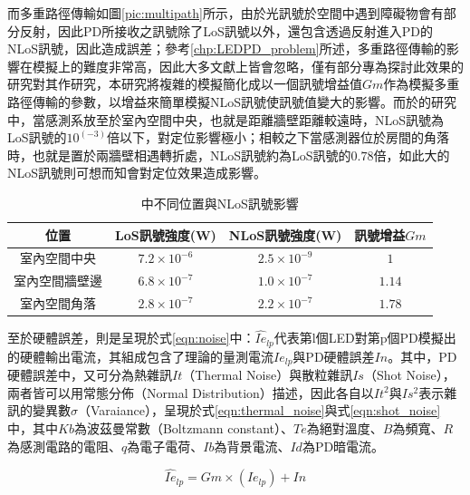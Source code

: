     而多重路徑傳輸如圖\ref{pic:multipath}所示，由於光訊號於空間中遇到障礙物會有部分反射，因此PD所接收之訊號除了LoS訊號以外，還包含透過反射進入PD的NLoS訊號，因此造成誤差；參考\ref{chp:LEDPD_problem}所述，多重路徑傳輸的影響在模擬上的難度非常高，因此大多文獻上皆會忽略，僅有部分專為探討此效果的研究對其作研究\cite{multipath_new}，本研究將複雜的模擬簡化成以一個訊號增益值$Gm$作為模擬多重路徑傳輸的參數，以增益來簡單模擬NLoS訊號使訊號值變大的影響。而於\cite{multipath_new}的研究中，當感測系放至於室內空間中央，也就是距離牆壁距離較遠時，NLoS訊號為LoS訊號的$10^(-3)$倍以下，對定位影響極小；相較之下當感測器位於房間的角落時，也就是置於兩牆壁相遇轉折處，NLoS訊號約為LoS訊號的$0.78$倍，如此大的NLoS訊號則可想而知會對定位效果造成影響。


    \begin{table}[htpb]
        \caption{\cite{multipath_new}中不同位置與NLoS訊號影響}
        \label{tab:gain_multipath}
        \centering
        \begin{tabular}{|c||c|c||c|}
            \hline
        \textbf{位置}&\textbf{LoS訊號強度}(W)&\textbf{NLoS訊號強度}(W)&\textbf{訊號增益$Gm$}\\
            \hline\hline
        室內空間中央&$7.2\times 10^{-6}$ &$2.5\times 10^{-9}$&$1$ \\\hline
        室內空間牆壁邊 &$6.8\times 10^{-7}$ &$1.0\times 10^{-7}$&$1.14$\\\hline
        室內空間角落 &$2.8\times 10^{-7}$ & $2.2\times 10^{-7}$&$1.78$\\
        \hline
        \end{tabular}
    \end{table}

    
    至於硬體誤差，則是呈現於式\ref{eqn:noise}中：$\hat{Ie}_{lp}$代表第l個LED對第p個PD模擬出的硬體輸出電流，其組成包含了理論的量測電流$Ie_{lp}$與PD硬體誤差$In$。其中，PD硬體誤差中，又可分為熱雜訊$It$（Thermal Noise）與散粒雜訊$Is$（Shot Noise），兩者皆可以用常態分佈（Normal Distribution）描述，因此各自以$It^2$與$Is^2$表示雜訊的變異數$\sigma$（Varaiance），呈現於式\ref{eqn:thermal_noise}與式\ref{eqn:shot_noise}中，其中$Kb$為波茲曼常數（Boltzmann constant）、$Te$為絕對溫度、$B$為頻寬、$R$為感測電路的電阻、$q$為電子電荷、$Ib$為背景電流、$Id$為PD暗電流。

    \begin{equation}
    \label{eqn:noise}
        \hat{Ie}_{lp}=Gm\times (Ie_{lp})+In 
    \end{equation}


